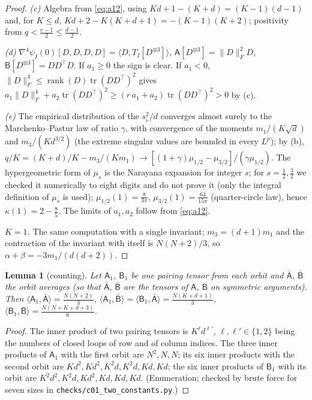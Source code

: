 \documentclass[10pt]{article}
\newtheorem{lemma}[theorem]{Lemma}
\theoremstyle{definition}
\theoremstyle{remark}
\newcommand{\nF}[1]{\|#1\|_{F}}
\newcommand{\inner}[2]{\langle #1, #2\rangle}
\newcommand{\tr}{\operatorname{tr}}
\newcommand{\cA}{\mathsf{A}}
\newcommand{\cB}{\mathsf{B}}
\begin{document}
\begin{proof}
\emph{(c)} Algebra from \eqref{eq:a12}, using $Kd+1-(K+d)=(K-1)(d-1)$ and, for $K\le d$,
$Kd+2-K(K+d+1)=-(K-1)(K+2)$; positivity from $q<\frac{r-1}2\le\frac{\bar d-1}2$.

\emph{(d)} $\nabla^4\psi_I(0)[D,D,D,D]=\inner D{T_I[D^{\otimes3}]}$, $\cA[D^{\otimes3}]=\nF D^2D$,
$\cB[D^{\otimes3}]=DD^\top D$. If $a_1\ge0$ the sign is clear. If $a_1<0$, $\nF D^4\le\operatorname{rank}(D)\tr(DD^\top)^2$
gives $a_1\nF D^4+a_2\tr(DD^\top)^2\ge(r\,a_1+a_2)\tr(DD^\top)^2>0$ by (c).

\emph{(e)} The empirical distribution of the $s_i^2/d$ converges almost surely to the Marchenko--Pastur law of ratio
$\gamma$, with convergence of the moments $m_1/(K\sqrt d)$ and $m_3/(Kd^{3/2})$ (the extreme singular values are bounded in
every $L^p$); by (b), $q/K=(K+d)/K-m_3/(Km_1)\to[(1+\gamma)\mu_{1/2}-\mu_{3/2}]/(\gamma\mu_{1/2})$. The hypergeometric
form of $\mu_s$ is the Narayana expansion for integer $s$; for $s=\frac12,\frac32$ we checked it numerically to eight
digits and do not prove it (only the integral definition of $\mu_s$ is used); $\mu_{1/2}(1)=\frac8{3\pi}$, $\mu_{3/2}(1)=\frac{64}{15\pi}$
(quarter-circle law), hence $\kappa(1)=2-\frac85$. The limits of $a_1,a_2$ follow from \eqref{eq:a12}.

\emph{$K=1$.} The same computation with a single invariant; $m_3=(d+1)m_1$ and the contraction of the invariant with
itself is $N(N+2)/3$, so $\alpha+\beta=-3m_1/(d(d+2))$.
\end{proof}

\begin{lemma}[counting]\label{lem:count}
Let $\mathsf A_1$, $\mathsf B_1$ be one pairing tensor from each orbit and $\bar{\mathsf A}$, $\bar{\mathsf B}$ the orbit
averages (so that $\bar{\mathsf A}$, $\bar{\mathsf B}$ are the tensors of $\cA$, $\cB$ on symmetric arguments). Then
$\inner{\mathsf A_1}{\bar{\mathsf A}}=\frac{N(N+2)}3$, $\inner{\mathsf A_1}{\bar{\mathsf B}}=\inner{\mathsf B_1}{\bar{\mathsf A}}=\frac{N(K+d+1)}3$,
$\inner{\mathsf B_1}{\bar{\mathsf B}}=\frac{N(N+K+d+3)}6$.
\end{lemma}
\begin{proof}
The inner product of two pairing tensors is $K^{\ell}d^{\ell'}$, $\ell,\ell'\in\{1,2\}$ being the numbers of closed
loops of row and of column indices. The three inner products of $\mathsf A_1$ with the first orbit are $N^2,N,N$; its
six inner products with the second orbit are $Kd^2,Kd^2,K^2d,K^2d,Kd,Kd$; the six inner products of $\mathsf B_1$ with
its orbit are $K^2d^2,K^2d,Kd^2,Kd,Kd,Kd$. (Enumeration; checked by brute force for seven sizes in
\texttt{checks/c01\_two\_constants.py}.)
\end{proof}
\end{document}
